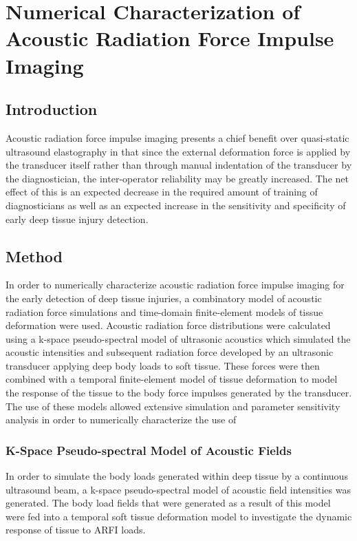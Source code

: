 \chapter{Numerical Characterization of Acoustic Radiation Force Impulse Imaging}
	\label{chap:arfi}
	\section{Introduction}
		Acoustic radiation force impulse imaging presents a chief benefit over quasi-static ultrasound elastography in that since the external deformation force is applied by the transducer itself rather than through manual indentation of the transducer by the diagnostician, the inter-operator reliability may be greatly increased. The net effect of this is an expected decrease in the required amount of training of diagnosticians as well as an expected increase in the sensitivity and specificity of early deep tissue injury detection.

	\section{Method}
	\label{sec:arfi_methods}
		In order to numerically characterize acoustic radiation force impulse imaging for the early detection of deep tissue injuries, a combinatory model of acoustic radiation force simulations and time-domain finite-element models of tissue deformation were used. Acoustic radiation force distributions were calculated using a k-space pseudo-spectral model of ultrasonic acoustics which simulated the acoustic intensities and subsequent radiation force developed by an ultrasonic transducer applying deep body loads to soft tissue. These forces were then combined with a temporal finite-element model of tissue deformation to model the response of the tissue to the body force impulses generated by the transducer. The use of these models allowed extensive simulation and parameter sensitivity analysis in order to numerically characterize the use of 

		\subsection{K-Space Pseudo-spectral Model of Acoustic Fields}
		\label{subsec:kspace_model}
			In order to simulate the body loads generated within deep tissue by a continuous ultrasound beam, a k-space pseudo-spectral model of acoustic field intensities was generated. The body load fields that were generated as a result of this model were fed into a temporal soft tissue deformation model to investigate the dynamic response of tissue to ARFI loads.

